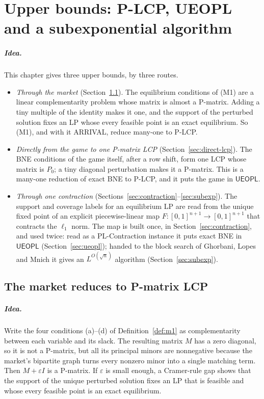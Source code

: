 \chapter{Upper bounds: P-LCP, UEOPL and a subexponential algorithm}\label{ch:upper}

\paragraph{Idea.} This chapter gives three upper bounds, by three routes.
\begin{itemize}[nosep]
\item \emph{Through the market} (Section~\ref{sec:plcp}). The equilibrium conditions of (M1) are a
linear complementarity problem whose matrix is almost a P-matrix. Adding a tiny multiple of the identity
makes it one, and the support of the perturbed solution fixes an LP whose every feasible point is an
exact equilibrium. So (M1),
and with it ARRIVAL, reduce many-one to P-LCP.
\item \emph{Directly from the game to one P-matrix LCP} (Section~\ref{sec:direct-lcp}). The BNE conditions
of the game itself, after a row shift, form one LCP whose matrix is $P_0$; a tiny diagonal perturbation
makes it a P-matrix. This is a many-one reduction of exact BNE to P-LCP, and it puts the game in
$\mathsf{UEOPL}$.
\item \emph{Through one contraction} (Sections~\ref{sec:contraction}--\ref{sec:subexp}). The support
and coverage labels for an equilibrium LP are read from the unique fixed point of an explicit piecewise-linear map
$F:[0,1]^{n+1}\to[0,1]^{n+1}$ that contracts the $\ell_1$ norm. The map is built once, in
Section~\ref{sec:contraction}, and used twice: read as a PL-Contraction instance it puts exact BNE in
$\mathsf{UEOPL}$ (Section~\ref{sec:ueopl}); handed to the block search of Ghorbani, Lopes and Mnich it
gives an $L^{O(\sqrt n)}$ algorithm (Section~\ref{sec:subexp}).
\end{itemize}

\section{The market reduces to P-matrix LCP}\label{sec:plcp}

\paragraph{Idea.} Write the four conditions (a)--(d) of Definition~\ref{def:m1} as complementarity
between each variable and its slack. The resulting matrix $M$ has a zero diagonal, so it is not a
P-matrix, but all its principal minors are nonnegative because the market's bipartite graph turns
every nonzero minor into a single matching term. Then $M+\varepsilon I$ is a P-matrix. If $\varepsilon$
is small enough, a Cramer-rule gap shows that the support of the unique perturbed solution fixes an LP that is
feasible and whose every feasible point is an exact equilibrium.

